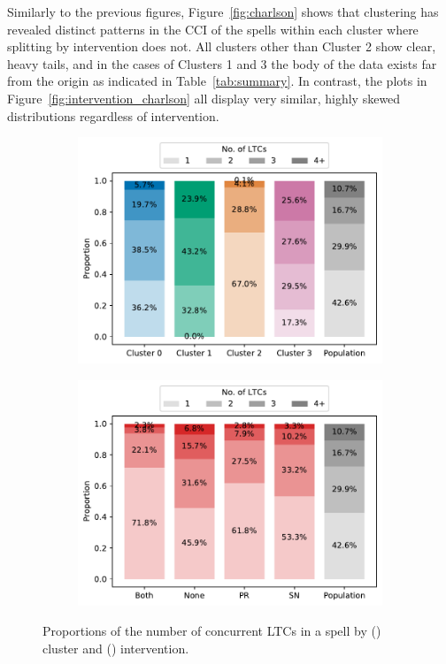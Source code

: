 \documentclass[11pt]{article}
\newlength{\imgwidth}
\begin{document}
Similarly to the previous figures, Figure~\ref{fig:charlson} shows that
clustering has revealed distinct patterns in the CCI of the spells within each
cluster where splitting by intervention does not. All clusters other than
Cluster 2 show clear, heavy tails, and in the cases of Clusters 1 and 3 the body
of the data exists far from the origin as indicated in Table~\ref{tab:summary}.
In contrast, the plots in Figure~\ref{fig:intervention_charlson} all display
very similar, highly skewed distributions regardless of intervention.

\begin{figure}
    \centering
    \begin{subfigure}{.5\imgwidth}
        \includegraphics[width=\linewidth]{img_cluster_ltcs}
        \caption{}\label{fig:cluster_ltcs}
    \end{subfigure}\hfill%
    \begin{subfigure}{.5\imgwidth}
        \includegraphics[width=\linewidth]{img_intervention_ltcs}
        \caption{}\label{fig:intervention_ltcs}
    \end{subfigure}
    \caption{%
        Proportions of the number of concurrent LTCs in a spell by
        () cluster and ()
        intervention.
    }\label{fig:ltcs}
\end{figure}
\end{document}
